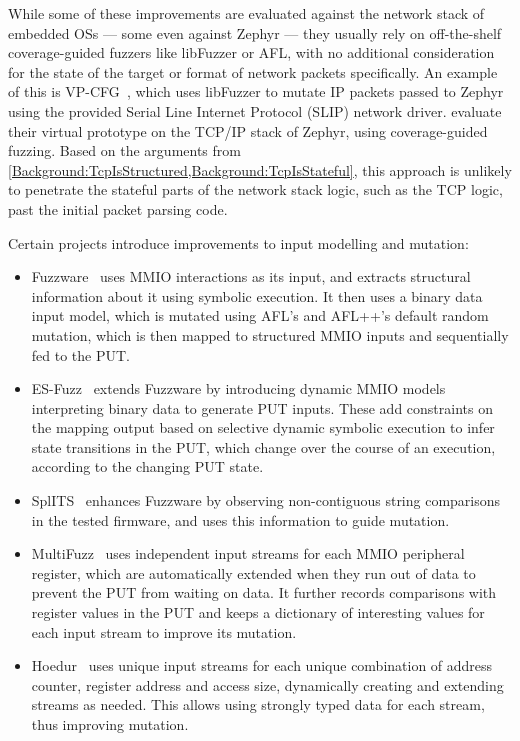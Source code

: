 \documentclass[twocolumn]{article}
\let\savedCite=\cite
\renewcommand{\cite}{\unskip~\savedCite}
\begin{document}
While some of these improvements are evaluated against the network stack of embedded OSs — some even against Zephyr — they usually rely on off-the-shelf coverage-guided fuzzers like libFuzzer or AFL, with no additional consideration for the state of the target or format of network packets specifically. An example of this is VP-CFG\cite{Veri}, which uses libFuzzer to mutate IP packets passed to Zephyr using the provided Serial Line Internet Protocol (SLIP) network driver. \citeauthor{EnhanceVP} evaluate their virtual prototype on the TCP/IP stack of Zephyr, using coverage-guided fuzzing. Based on the arguments from \cref{Background:TcpIsStructured,Background:TcpIsStateful}, this approach is unlikely to penetrate the stateful parts of the network stack logic, such as the TCP logic, past the initial packet parsing code.

Certain projects introduce improvements to input modelling and mutation:
\begin{itemize}
  \item Fuzzware\cite{Fuzzware} uses MMIO interactions as its input, and extracts structural information about it using symbolic execution. It then uses a binary data input model, which is mutated using AFL's and AFL++'s default random mutation, which is then mapped to structured MMIO inputs and sequentially fed to the PUT.
  \item ES-Fuzz\cite{ESFuzz} extends Fuzzware by introducing dynamic MMIO models interpreting binary data to generate PUT inputs. These add constraints on the mapping output based on selective dynamic symbolic execution to infer state transitions in the PUT, which change over the course of an execution, according to the changing PUT state.
  \item SplITS\cite{SplITS} enhances Fuzzware by observing non-contiguous string comparisons in the tested firmware, and uses this information to guide mutation.
  \item MultiFuzz\cite{MultiFuzz} uses independent input streams for each MMIO peripheral register, which are automatically extended when they run out of data to prevent the PUT from waiting on data. It further records comparisons with register values in the PUT and keeps a dictionary of interesting values for each input stream to improve its mutation.
  \item Hoedur\cite{Hoedur} uses unique input streams for each unique combination of address counter, register address and access size, dynamically creating and extending streams as needed. This allows using strongly typed data for each stream, thus improving mutation.
\end{itemize}
\end{document}
